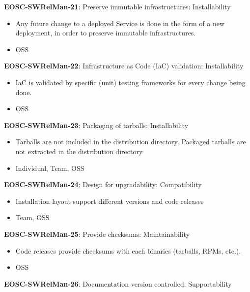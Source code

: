 \textbf{EOSC-SWRelMan-21}: Preserve immutable infrastructures: Installability

\begin{itemize}
    \item Any future change to a deployed Service is done in the form of a new deployment, in order to preserve immutable infrastructures. \cite{orviz_fernandez_eosc-synergy_2020}
    \item OSS
\end{itemize}

\textbf{EOSC-SWRelMan-22}: Infrastructure as Code (IaC) validation: Installability

\begin{itemize}
    \item IaC is validated by specific (unit) testing frameworks for every change being done. \cite{orviz_fernandez_eosc-synergy_2020}
    \item OSS
\end{itemize}

\textbf{EOSC-SWRelMan-23}: Packaging of tarballs: Installability

\begin{itemize}
    \item Tarballs are not included in the distribution directory. Packaged tarballs are not extracted in the distribution directory \cite{raymond_software_2013}
    \item Individual, Team, OSS
\end{itemize}

\textbf{EOSC-SWRelMan-24}: Design for upgradability: Compatibility

\begin{itemize}
    \item Installation layout support different versions and code releases \cite{raymond_software_2013}
    \item Team, OSS
\end{itemize}

\textbf{EOSC-SWRelMan-25}: Provide checksums: Maintainability

\begin{itemize}
    \item Code releases provide checksums with each binaries (tarballs, RPMs, etc.). \cite{raymond_software_2013}
    \item OSS
\end{itemize}

\textbf{EOSC-SWRelMan-26}: Documentation version controlled: Supportability


